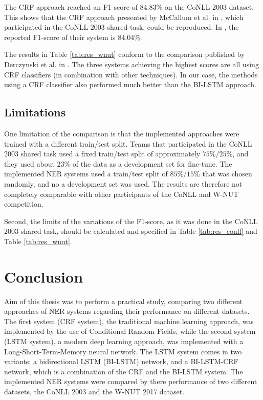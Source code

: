 \documentclass[12pt]{book}
\begin{document}
	The CRF approach reached an F1 score of 84.83\% on the CoNLL 2003 dataset. This shows that the CRF approach presented by McCallum et al. in \cite{mccallum2003early}, which participated in the CoNLL 2003 shared task, could be reproduced. In  \cite{tjongkimsang2003conll}, the reported F1-score of their system is 84.04\%.
	
	The results in Table \ref{tab:res_wnut} conform to the comparison published by Derczynski et al. in \cite{derczynski2017results}. The three systems achieving the highest scores are all using CRF classifiers (in combination with other techniques). In our case, the methods using a CRF classifier also performed much better than the BI-LSTM approach.
	
	\section{Limitations}
	\label{sec:limitations}
	
	One limitation of the comparison is that the implemented approaches were trained with a different train/test split. Teams that participated in the CoNLL 2003 shared task used a fixed train/test split of approximately $75\% / 25\%$, and they used about $23\%$ of the data as a development set for fine-tune. The implemented NER systems used a train/test split of $85\% / 15\%$ that was chosen randomly, and no a development set was used. The results are therefore not completely comparable with other participants of the CoNLL and W-NUT competition.
	
	Second, the limits of the variations of the F1-score, as it was done in the CoNLL 2003 shared task, should be calculated and specified in Table \ref{tab:res_conll} and Table \ref{tab:res_wnut}.

	\chapter{Conclusion}
	\label{chap:conclusion}
	
	Aim of this thesis was to perform a practical study, comparing two different approaches of NER systems regarding their performance on different datasets. 
	The first system (CRF system), the traditional machine learning approach, was implemented by the use of Conditional Random Fields, while the second system (LSTM system), a modern deep learning approach, was implemented with a Long-Short-Term-Memory neural network. The LSTM system comes in two variants: a bidirectional LSTM (BI-LSTM) network, and a BI-LSTM-CRF network, which is a combination of the CRF and the BI-LSTM system. The implemented NER systems were compared by there performance of two different datasets, the CoNLL 2003 and the W-NUT 2017 dataset.
	
\end{document}
